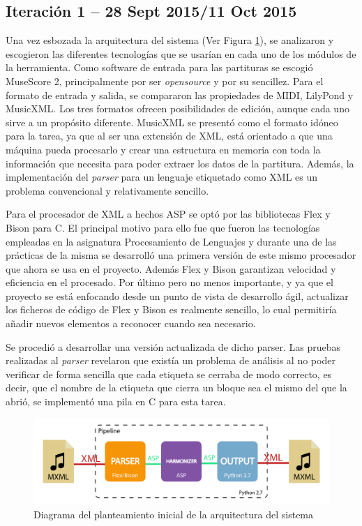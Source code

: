 \subsection{Iteración 1 -- 28 Sept 2015/11 Oct 2015}
\label{subsec:first_iteration}
Una vez esbozada la arquitectura del sistema (Ver Figura \ref{fig:arquitectura_inicial}), se analizaron y escogieron las diferentes tecnologías que se usarían en cada uno de los módulos de la herramienta. 
Como software de entrada para las partituras se escogió MuseScore 2, principalmente por ser \textit{opensource} y por su sencillez. Para el formato de entrada y salida, se compararon las propiedades de MIDI, LilyPond y MusicXML. Los tres formatos ofrecen posibilidades de edición, aunque cada uno sirve a un propósito diferente. MusicXML se presentó como el formato idóneo para la tarea, ya que al ser una extensión de XML, está orientado a que una máquina pueda procesarlo y crear una estructura en memoria con toda la información que necesita para poder extraer los datos de la partitura. Además, la implementación del \textit{parser} para un lenguaje etiquetado como XML es un problema convencional y relativamente sencillo.

Para el procesador de XML a hechos ASP se optó por las bibliotecas Flex y Bison para C. El principal motivo para ello fue que fueron las tecnologías empleadas en la asignatura Procesamiento de Lenguajes y durante una de las prácticas de la misma se desarrolló una primera versión de este mismo procesador que ahora se usa en el proyecto. Además Flex y Bison garantizan velocidad y eficiencia en el procesado. Por último pero no menos importante, y ya que el proyecto se está enfocando desde un punto de vista de desarrollo ágil, actualizar los ficheros de código de Flex y Bison es realmente sencillo, lo cual permitiría añadir nuevos elementos a reconocer cuando sea necesario.

Se procedió a desarrollar una versión actualizada de dicho parser. Las pruebas realizadas al \textit{parser} revelaron que existía un problema de análisis al no poder verificar de forma sencilla que cada etiqueta se cerraba de modo correcto, es decir, que el nombre de la etiqueta que cierra un bloque sea el mismo del que la abrió, se implementó una pila en C para esta tarea. 

\begin{figure}
	\centering
	\includegraphics[width=0.8\linewidth]{imagenes/arquitectura_inicial.pdf}
	\caption{Diagrama del planteamiento inicial de la arquitectura del sistema}
	\label{fig:arquitectura_inicial}
\end{figure}

